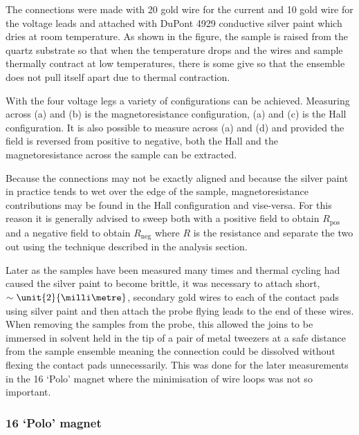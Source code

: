 The connections were made with \unit{20}{\micro\metre} gold wire for the current and \unit{10}{\micro\metre} gold wire for the voltage leads and attached with DuPont 4929 conductive silver paint which dries at room temperature. As shown in the figure, the sample is raised from the quartz substrate so that when the temperature drops and the wires and sample thermally contract at low temperatures, there is some give so that the ensemble does not pull itself apart due to thermal contraction.

With the four voltage legs a variety of configurations can be achieved. Measuring across (a) and (b) is the magnetoresistance configuration, (a) and (c) is the Hall configuration. It is also possible to measure across (a) and (d) and provided the field is reversed from positive to negative, both the Hall and the magnetoresistance across the sample can be extracted.

Because the connections may not be exactly aligned and because the silver paint in practice tends to wet over the edge of the sample, magnetoresistance contributions may be found in the Hall configuration and vise-versa. For this reason it is generally advised to sweep both with a positive field to obtain $R_{\textrm{pos}}$ and a negative field to obtain $R_{\textrm{neg}}$ where $R$ is the resistance and separate the two out using the technique described in the analysis section.

Later as the samples have been measured many times and thermal cycling had caused the silver paint to become brittle, it was necessary to attach short, $\sim\unit{2}{\milli\metre}$, secondary gold wires to each of the contact pads using silver paint and then attach the probe flying leads to the end of these wires. When removing the samples from the probe, this allowed the joins to be immersed in solvent held in the tip of a pair of metal tweezers at a safe distance from the sample ensemble meaning the connection could be dissolved without flexing the contact pads unnecessarily. This was done for the later measurements in the \unit{16}{\tesla} `Polo' magnet where the minimisation of wire loops was not so important.

\subsubsection{\unit{16}{\tesla} `Polo' magnet}

